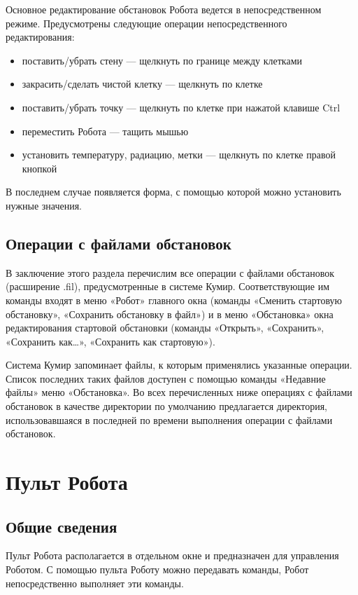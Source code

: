 Основное редактирование обстановок Робота ведется в непосредственном режиме. Предусмотрены следующие операции непосредственного редактирования:
\begin{itemize}
\item поставить/убрать стену --- щелкнуть по границе между клетками
\item закрасить/сделать чистой клетку --- щелкнуть по клетке
\item поставить/убрать точку --- щелкнуть по клетке при нажатой клавише Ctrl
\item переместить Робота --- тащить мышью
\item установить температуру, радиацию, метки --- щелкнуть по клетке правой кнопкой
\end{itemize}

В последнем случае появляется форма, с помощью которой можно установить нужные значения.

\subsection{Операции с файлами обстановок}
\label{robotfieldfiles}

В заключение этого раздела перечислим все операции с файлами обстановок (расширение .fil), предусмотренные в системе Кумир. Соответствующие им команды входят в меню «Робот» главного окна (команды «Сменить стартовую обстановку», «Сохранить обстановку в файл») и в меню «Обстановка» окна редактирования стартовой обстановки (команды «Открыть», «Сохранить»,  «Сохранить как\dots», «Сохранить как стартовую»).

Система Кумир запоминает файлы, к которым применялись указанные операции. Список последних таких файлов доступен с помощью команды «Недавние файлы» меню «Обстановка». Во всех перечисленных ниже операциях с файлами обстановок в качестве директории по умолчанию предлагается директория, использовавшаяся в последней по времени выполнения операции с файлами обстановок.

\section{Пульт Робота}
\label{robotpult}

\subsection{Общие сведения}

Пульт Робота располагается в отдельном окне и предназначен для управления Роботом. С помощью пульта Роботу можно передавать команды, Робот непосредственно выполняет эти команды. 

